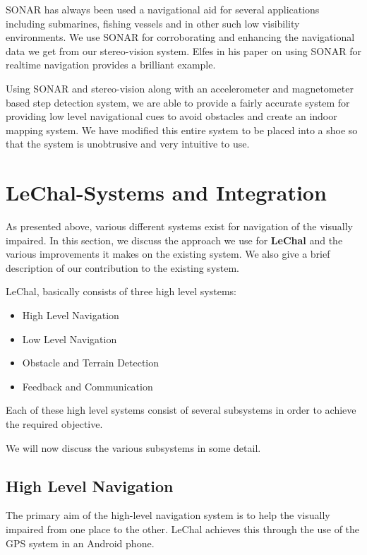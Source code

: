 \documentclass[11pt]{report}
\begin{document}
{SONAR has always been used a navigational aid for several applications including submarines, fishing vessels and in other such low visibility environments. We use SONAR for corroborating and enhancing the navigational data we get from our stereo-vision system. Elfes\cite{sonar} in his paper on using SONAR for realtime navigation provides a brilliant example. 

Using SONAR and stereo-vision along with an accelerometer and magnetometer based step detection system, we are able to provide a fairly accurate system for providing low level navigational cues to avoid obstacles and create an indoor mapping system. We have modified this entire system to be placed into a shoe so that the system is unobtrusive and very intuitive to use.


\section{LeChal-Systems and Integration}

As presented above, various different systems exist for navigation of the visually impaired. In this section, we discuss the approach we use for \textbf{LeChal} and the various improvements it makes on the existing system. We also give a brief description of our contribution to the existing system.

LeChal, basically consists of three high level systems:
\label{subsystems}
\begin{itemize}
\item High Level Navigation
\item Low Level Navigation 
\item Obstacle and Terrain Detection
\item Feedback and Communication
\end{itemize}

Each of these high level systems consist of several subsystems in order to achieve the required objective. 

We will now discuss the various subsystems in some detail.

\subsection{High Level Navigation}

The primary aim of the high-level navigation system is to help the visually impaired from one place to the other. LeChal achieves this through the use of the GPS system in an Android phone. 

}
\end{document}
